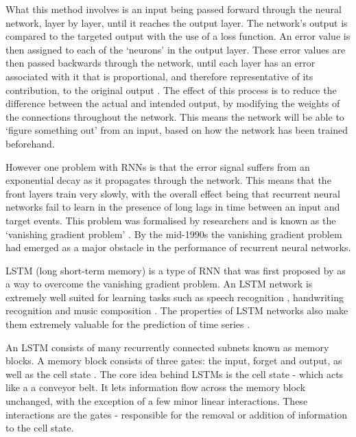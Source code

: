 What this method involves is an input being passed forward through the neural network, layer by layer, until it reaches the output layer. The network's output is compared to the targeted output with the use of a loss function. An error value is then assigned to each of the `neurons' in the output layer. These error values are then passed backwards through the network, until each layer has an error associated with it that is proportional, and therefore representative of its contribution, to the original output \cite{Graves2012}. The effect of this process is to reduce the difference between the actual and intended output, by modifying the weights of the connections throughout the network. This means the network will be able to `figure something out' from an input, based on how the network has been trained beforehand.

However one problem with RNNs is that the error signal suffers from an exponential decay as it propagates through the network. This means that the front layers train very slowly, with the overall effect being that recurrent neural networks fail to learn in the presence of long lags in time between an input and target events. This problem was formalised by researchers and is known as the `vanishing gradient problem' \cite{hochreiter1991untersuchungen, hochreiter2001gradient}. By the mid-1990s the vanishing gradient problem had emerged as a major obstacle in the performance of recurrent neural networks.

LSTM (long short-term memory) is a type of RNN that was first proposed by \cite{Hochreiter:1997:LSM:1246443.1246450} as a way to overcome the vanishing gradient problem. An LSTM network is extremely well suited for learning tasks such as speech recognition \cite{Graves2005602}, handwriting recognition \cite{graves2008unconstrained} and music composition \cite{eck2002learning}. The properties of LSTM networks also make them extremely valuable for the prediction of time series \cite{gers2001applying}.

An LSTM consists of many recurrently connected subnets known as memory blocks. A memory block consists of three gates: the input, forget and output, as well as the cell state \cite{gers2000learning}. The core idea behind LSTMs is the cell state - which acts like a a conveyor belt. It lets information flow across the memory block unchanged, with the exception of a few minor linear interactions. These interactions are the gates - responsible for the removal or addition of information to the cell state.

